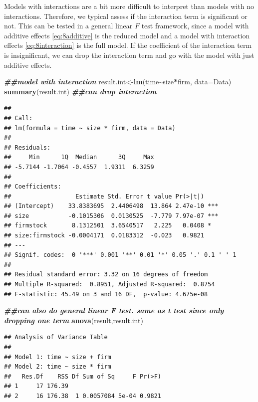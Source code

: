 \documentclass[
]{book}
\newenvironment{Shaded}{\begin{snugshade}}{\end{snugshade}}
\newcommand{\AttributeTok}[1]{\textcolor[rgb]{0.13,0.29,0.53}{#1}}
\newcommand{\DocumentationTok}[1]{\textcolor[rgb]{0.56,0.35,0.01}{\textbf{\textit{#1}}}}
\newcommand{\FunctionTok}[1]{\textcolor[rgb]{0.13,0.29,0.53}{\textbf{#1}}}
\newcommand{\NormalTok}[1]{#1}
\newcommand{\OtherTok}[1]{\textcolor[rgb]{0.56,0.35,0.01}{#1}}
\newcommand{\SpecialCharTok}[1]{\textcolor[rgb]{0.81,0.36,0.00}{\textbf{#1}}}
\begin{document}
Models with interactions are a bit more difficult to interpret than models with no interactions. Therefore, we typical assess if the interaction term is significant or not. This can be tested in a general linear \(F\) test framework, since a model with additive effects \eqref{eq:8additive} is the reduced model and a model with interaction effects \eqref{eq:8interaction} is the full model. If the coefficient of the interaction term is insignificant, we can drop the interaction term and go with the model with just additive effects.

\begin{Shaded}
\begin{Highlighting}[]
\DocumentationTok{\#\#model with interaction}
\NormalTok{result.int}\OtherTok{\textless{}{-}}\FunctionTok{lm}\NormalTok{(time}\SpecialCharTok{\textasciitilde{}}\NormalTok{size}\SpecialCharTok{*}\NormalTok{firm, }\AttributeTok{data=}\NormalTok{Data)}
\FunctionTok{summary}\NormalTok{(result.int) }\DocumentationTok{\#\#can drop interaction}
\end{Highlighting}
\end{Shaded}

\begin{verbatim}
## 
## Call:
## lm(formula = time ~ size * firm, data = Data)
## 
## Residuals:
##     Min      1Q  Median      3Q     Max 
## -5.7144 -1.7064 -0.4557  1.9311  6.3259 
## 
## Coefficients:
##                  Estimate Std. Error t value Pr(>|t|)    
## (Intercept)    33.8383695  2.4406498  13.864 2.47e-10 ***
## size           -0.1015306  0.0130525  -7.779 7.97e-07 ***
## firmstock       8.1312501  3.6540517   2.225   0.0408 *  
## size:firmstock -0.0004171  0.0183312  -0.023   0.9821    
## ---
## Signif. codes:  0 '***' 0.001 '**' 0.01 '*' 0.05 '.' 0.1 ' ' 1
## 
## Residual standard error: 3.32 on 16 degrees of freedom
## Multiple R-squared:  0.8951, Adjusted R-squared:  0.8754 
## F-statistic: 45.49 on 3 and 16 DF,  p-value: 4.675e-08
\end{verbatim}

\begin{Shaded}
\begin{Highlighting}[]
\DocumentationTok{\#\#can also do general linear F test. same as t test since only dropping one term}
\FunctionTok{anova}\NormalTok{(result,result.int)}
\end{Highlighting}
\end{Shaded}

\begin{verbatim}
## Analysis of Variance Table
## 
## Model 1: time ~ size + firm
## Model 2: time ~ size * firm
##   Res.Df    RSS Df Sum of Sq     F Pr(>F)
## 1     17 176.39                          
## 2     16 176.38  1 0.0057084 5e-04 0.9821
\end{verbatim}
\end{document}
